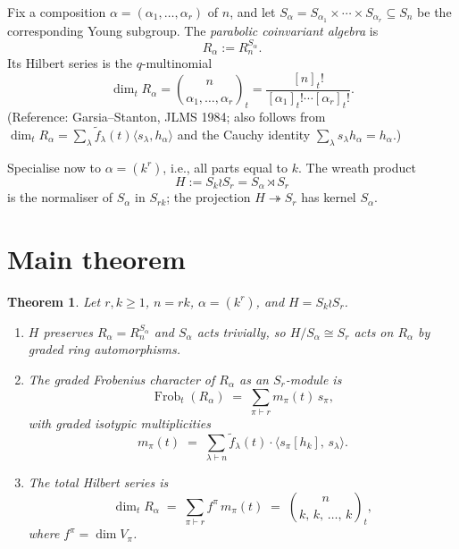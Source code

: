 \documentclass[11pt]{article}
\newtheorem{theorem}{Theorem}
\theoremstyle{definition}
\theoremstyle{remark}
\newcommand{\Frob}{\operatorname{Frob}}
\newcommand{\fdeg}{\widetilde{f}}
\begin{document}
Fix a composition $\alpha = (\alpha_1, \ldots, \alpha_r)$ of $n$, and let
$S_\alpha = S_{\alpha_1} \times \cdots \times S_{\alpha_r} \subseteq S_n$
be the corresponding Young subgroup. The \emph{parabolic coinvariant
algebra} is
\[
R_\alpha := R_n^{S_\alpha}.
\]
Its Hilbert series is the $q$-multinomial
\[
\dim_t R_\alpha = \binom{n}{\alpha_1, \ldots, \alpha_r}_t
= \frac{[n]_t!}{[\alpha_1]_t! \cdots [\alpha_r]_t!}.
\]
(Reference: Garsia--Stanton, JLMS 1984; also follows from
$\dim_t R_\alpha = \sum_\lambda \fdeg_\lambda(t) \langle s_\lambda, h_\alpha\rangle$
and the Cauchy identity $\sum_\lambda s_\lambda h_\alpha = h_\alpha$.)

\medskip

Specialise now to $\alpha = (k^r)$, i.e., all parts equal to $k$. The
wreath product
\[
H := S_k \wr S_r = S_\alpha \rtimes S_r
\]
is the normaliser of $S_\alpha$ in $S_{rk}$; the projection
$H \twoheadrightarrow S_r$ has kernel $S_\alpha$.

\section{Main theorem}

\begin{theorem}\label{thm:main}
Let $r, k \ge 1$, $n = rk$, $\alpha = (k^r)$, and $H = S_k \wr S_r$.
\begin{enumerate}
\item[(i)] $H$ preserves $R_\alpha = R_n^{S_\alpha}$ and $S_\alpha$ acts
  trivially, so $H/S_\alpha \cong S_r$ acts on $R_\alpha$ by graded
  ring automorphisms.
\item[(ii)] The graded Frobenius character of $R_\alpha$ as an
  $S_r$-module is
\[
\Frob_t(R_\alpha) \;=\; \sum_{\pi \vdash r} m_\pi(t) \, s_\pi,
\]
with graded isotypic multiplicities
\[
\boxed{\;
m_\pi(t) \;=\; \sum_{\lambda \vdash n} \fdeg_\lambda(t) \cdot
\langle s_\pi[h_k],\, s_\lambda \rangle.
\;}
\]
\item[(iii)] The total Hilbert series is
\[
\dim_t R_\alpha \;=\; \sum_{\pi \vdash r} f^\pi \, m_\pi(t)
\;=\; \binom{n}{k,\,k,\,\ldots,\,k}_t,
\]
where $f^\pi = \dim V_\pi$.
\end{enumerate}
\end{theorem}
\end{document}
